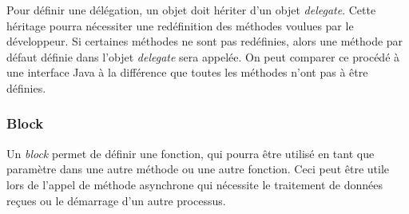 Pour définir une délégation, un objet doit hériter d'un objet \textit{delegate}. Cette héritage pourra nécessiter une redéfinition des méthodes voulues par le développeur. Si certaines méthodes ne sont pas redéfinies, alors une méthode par défaut définie dans l'objet \textit{delegate} sera appelée. On peut comparer ce procédé à une interface Java à la différence que toutes les méthodes n'ont pas à être définies.

\subsubsection{Block}

Un \textit{block} permet de définir une fonction, qui pourra être utilisé en tant que paramètre dans une autre méthode ou une autre fonction. Ceci peut être utile lors de l'appel de méthode asynchrone qui nécessite le traitement de données reçues ou le démarrage d'un autre processus.